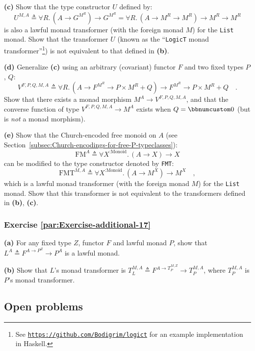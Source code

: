 \textbf{(c)} Show that the type constructor $U$ defined by:
\[
U^{M,A}\triangleq\forall R.\,(A\rightarrow G^{M^{R}})\rightarrow G^{M^{R}}=\forall R.\,(A\rightarrow M^{R}\rightarrow M^{R})\rightarrow M^{R}\rightarrow M^{R}
\]
is also a lawful monad transformer (with the foreign monad $M$) for
the \lstinline!List! monad. Show that the transformer $U$ (known
as the \textsf{``}\lstinline!LogicT! monad transformer\textsf{''}\footnote{See \texttt{\href{https://github.com/Bodigrim/logict}{https://github.com/Bodigrim/logict}}
for an example implementation in Haskell.}) is not equivalent to that defined in \textbf{(b)}. 

\textbf{(d)} Generalize \textbf{(c)} using an arbitrary (covariant)
functor $F$ and two fixed types $P$, $Q$:
\[
V^{F,P,Q,M,A}\triangleq\forall R.\,(A\rightarrow F^{M^{R}}\rightarrow P\times M^{R}+Q)\rightarrow F^{M^{R}}\rightarrow P\times M^{R}+Q\quad.
\]
Show that there exists a monad morphism $M^{A}\rightarrow V^{F,P,Q,M,A}$,
and that the converse function of type $V^{F,P,Q,M,A}\rightarrow M^{A}$
exists when $Q=\bbnum 0$ (but is \emph{not} a monad morphism).

\textbf{(e)} Show that the Church-encoded free monoid on $A$ (see
Section~\ref{subsec:Church-encodings-for-free-P-typeclasses}):
\[
\text{FM}^{A}\triangleq\forall X^{:\text{Monoid}}.\,(A\rightarrow X)\rightarrow X
\]
can be modified to the type constructor denoted by \lstinline!FMT!:
\[
\text{FMT}^{M,A}\triangleq\forall X^{:\text{Monoid}}.\,(A\rightarrow M^{X})\rightarrow M^{X}\quad,
\]
which is a lawful monad transformer (with the foreign monad $M$)
for the \lstinline!List! monad. Show that this transformer is not
equivalent to the transformers defined in \textbf{(b)}, \textbf{(c)}. 

\subsubsection{Exercise \label{par:Exercise-additional-17}\ref{par:Exercise-additional-17}}

\textbf{(a)} For any fixed type $Z$, functor $F$ and lawful monad
$P$, show that $L^{A}\triangleq F^{A\rightarrow P^{Z}}\rightarrow P^{A}$
is a lawful monad.

\textbf{(b)} Show that $L$\textsf{'}s monad transformer is $T_{L}^{M,A}\triangleq F^{A\rightarrow T_{P}^{M,Z}}\rightarrow T_{P}^{M,A}$,
where $T_{P}^{M,A}$ is $P$\textsf{'}s monad transformer.

\subsection{Open problems}

